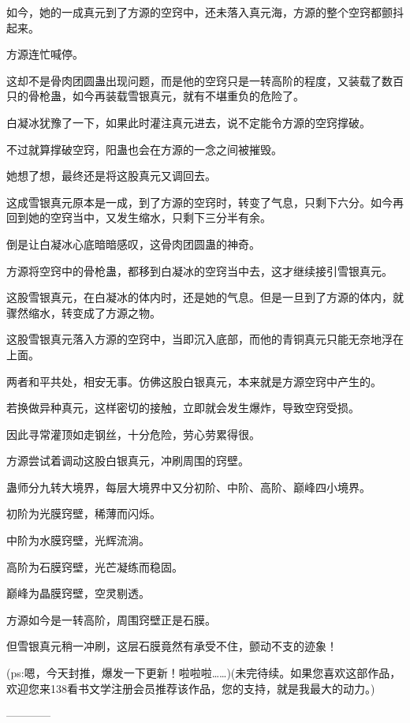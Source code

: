 \begin{this_body}
如今，她的一成真元到了方源的空窍中，还未落入真元海，方源的整个空窍都颤抖起来。

方源连忙喊停。

这却不是骨肉团圆蛊出现问题，而是他的空窍只是一转高阶的程度，又装载了数百只的骨枪蛊，如今再装载雪银真元，就有不堪重负的危险了。

白凝冰犹豫了一下，如果此时灌注真元进去，说不定能令方源的空窍撑破。

不过就算撑破空窍，阳蛊也会在方源的一念之间被摧毁。

她想了想，最终还是将这股真元又调回去。

这成雪银真元原本是一成，到了方源的空窍时，转变了气息，只剩下六分。如今再回到她的空窍当中，又发生缩水，只剩下三分半有余。

倒是让白凝冰心底暗暗感叹，这骨肉团圆蛊的神奇。

方源将空窍中的骨枪蛊，都移到白凝冰的空窍当中去，这才继续接引雪银真元。

这股雪银真元，在白凝冰的体内时，还是她的气息。但是一旦到了方源的体内，就骤然缩水，转变成了方源之物。

这股雪银真元落入方源的空窍中，当即沉入底部，而他的青铜真元只能无奈地浮在上面。

两者和平共处，相安无事。仿佛这股白银真元，本来就是方源空窍中产生的。

若换做异种真元，这样密切的接触，立即就会发生爆炸，导致空窍受损。

因此寻常灌顶如走钢丝，十分危险，劳心劳累得很。

方源尝试着调动这股白银真元，冲刷周围的窍壁。

蛊师分九转大境界，每层大境界中又分初阶、中阶、高阶、巅峰四小境界。

初阶为光膜窍壁，稀薄而闪烁。

中阶为水膜窍壁，光辉流淌。

高阶为石膜窍壁，光芒凝练而稳固。

巅峰为晶膜窍壁，空灵剔透。

方源如今是一转高阶，周围窍壁正是石膜。

但雪银真元稍一冲刷，这层石膜竟然有承受不住，颤动不支的迹象！

(ps:嗯，今天封推，爆发一下更新！啦啦啦……)(未完待续。如果您喜欢这部作品，欢迎您来138看书文学注册会员推荐该作品，您的支持，就是我最大的动力。)

------------

\end{this_body}

